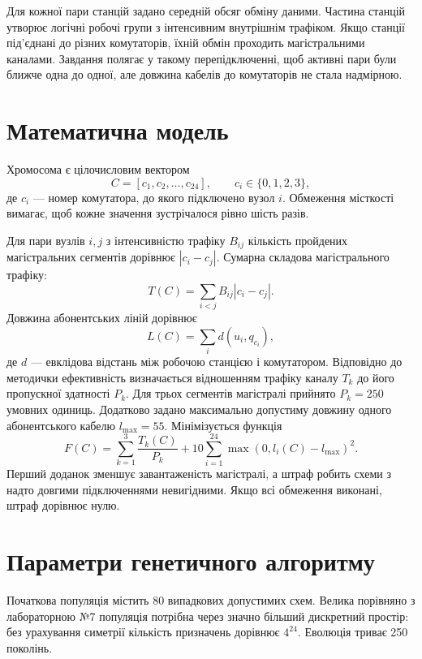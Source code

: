 \documentclass[12pt,a4paper]{article}
\begin{document}
Для кожної пари станцій задано середній обсяг обміну даними. Частина станцій утворює логічні робочі групи з інтенсивним внутрішнім трафіком. Якщо станції під'єднані до різних комутаторів, їхній обмін проходить магістральними каналами. Завдання полягає у такому перепідключенні, щоб активні пари були ближче одна до одної, але довжина кабелів до комутаторів не стала надмірною.

\section{Математична модель}
Хромосома є цілочисловим вектором
\begin{equation}C=[c_1,c_2,\ldots,c_{24}],\qquad c_i\in\{0,1,2,3\},\end{equation}
де $c_i$ --- номер комутатора, до якого підключено вузол $i$. Обмеження місткості вимагає, щоб кожне значення зустрічалося рівно шість разів.

Для пари вузлів $i,j$ з інтенсивністю трафіку $B_{ij}$ кількість пройдених магістральних сегментів дорівнює $|c_i-c_j|$. Сумарна складова магістрального трафіку:
\begin{equation}T(C)=\sum_{i<j}B_{ij}|c_i-c_j|.\end{equation}
Довжина абонентських ліній дорівнює
\begin{equation}L(C)=\sum_i d(u_i,q_{c_i}),\end{equation}
де $d$ --- евклідова відстань між робочою станцією і комутатором. Відповідно до методички ефективність визначається відношенням трафіку каналу $T_k$ до його пропускної здатності $P_k$. Для трьох сегментів магістралі прийнято $P_k=250$ умовних одиниць. Додатково задано максимально допустиму довжину одного абонентського кабелю $l_{\max}=55$. Мінімізується функція
\begin{equation}
F(C)=\sum_{k=1}^{3}\frac{T_k(C)}{P_k}+10\sum_{i=1}^{24}\max\!\left(0,l_i(C)-l_{\max}\right)^2.
\end{equation}
Перший доданок зменшує завантаженість магістралі, а штраф робить схеми з надто довгими підключеннями невигідними. Якщо всі обмеження виконані, штраф дорівнює нулю.

\section{Параметри генетичного алгоритму}
Початкова популяція містить 80 випадкових допустимих схем. Велика порівняно з лабораторною №7 популяція потрібна через значно більший дискретний простір: без урахування симетрії кількість призначень дорівнює $4^{24}$. Еволюція триває 250 поколінь.
\end{document}
